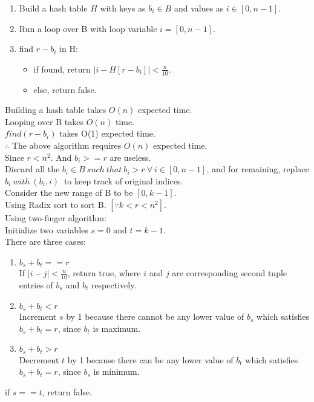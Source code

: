 \documentclass[12pt,twoside]{article}
\begin{document}
\begin{problems}
\problem  %

\begin{problemparts}
\problempart %

\begin{enumerate}
    \item Build a hash table $H$ with keys as $b_i \in B$ and values as $i \in [0, n-1]$.
    \item Run a loop over B with loop variable $i = [0, n-1]$.
    \item find $r - b_i$ in H:
    \begin{itemize}
        \item if found, return $|i - H[r - b_i]| < \frac{n}{10}$.
        \item else, return false.
    \end{itemize}
\end{enumerate}

Building a hash table takes $O(n)$ expected time. \\ 
Looping over B takes $O(n)$ time. \\
$find(r - b_i)$ takes O(1) expected time. \\

$\therefore$ The above algorithm requires $O(n)$ expected time.
\\
\problempart %
Since $r < n^2$. And $b_i >= r$ are useless. \\
Discard all the $b_i \in B\ such\ that\ b_i > r\ \forall\ i \in [0, n-1]$, and for remaining, replace $b_i\ with\ (b_i, i)\ $ to keep track of original indices. \\

Consider the new range of B to be $[0, k-1]$. \\
Using Radix sort to sort B. \quad \quad $[\because k < r < n^2]$. \\

Using two-finger algorithm: \\
Initialize two variables $s=0$ and $t=k-1$. \\
There are three cases:
\begin{enumerate}
    \item $b_s + b_t == r$ \\
        If $|i - j| < \frac{n}{10}$, return true, where $i$ and $j$ are corresponding second tuple entries of $b_s$ and $b_t$ respectively.
    \item $b_s + b_t < r$ \\
        Increment $s$ by 1 because there cannot be any lower value of $b_s$ which satisfies $b_s + b_t = r$, since $b_t$ is maximum.
    \item $b_s + b_t > r$ \\
        Decrement $t$ by 1 because there can be any lower value of $b_t$ which satisfies $b_s + b_t = r$, since $b_s$ is minimum. 
\end{enumerate} 
if $s == t$, return false.\\


\end{problemparts}
\end{problems}
\end{document}
